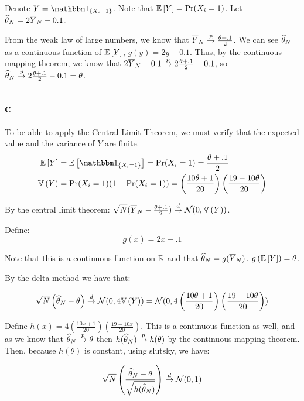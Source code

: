 \documentclass[12pt]{paper}
\begin{document}
Denote $Y = \indicate{X_i = 1}$. Note that $\mathbb{E} \left [ Y \right ] = \Pr( X_i
=1)$. Let $\widehat{ \theta }_{N} = 2 \overline{ Y }_{N} - 0.1$. 

From the weak law of large numbers, we know that $\overline{ Y }_{N} \overset{p}{\to}
\frac{\theta + .1}{2}$. We can see $\widehat{ \theta }_{N}$ as a continuous function of $\mathbb{E} \left [ Y \right ]$, $g(y)=2y-0.1$. Thus, by the continuous mapping theorem, we know
that 2$\overline{ Y }_{N}-0.1 \overset{p}{\to} 2\frac{\theta + .1}{2}-0.1$, so $\widehat{ \theta }_{N} \overset{p}{\to} 2
\frac{\theta + .1}{2} - 0.1 = \theta$.


\subsection*{c}
To be able to apply the Central Limit Theorem, we must verify that the
expected value and the variance of $Y$ are finite.
\begin{align*}
  \exV{Y} &= \exV{\indicate{X_i = 1}} = \Pr( X_i = 1 ) =
            \frac{\theta+.1}{2}\\
  \Vari{Y} &= \Pr( X_i = 1 )( 1 - \Pr( X_i = 1)) = \left(
             \frac{10\theta+1}{20}  \right) \left( \frac{19-10\theta}{20} \right)\\
\end{align*}

By the central limit theorem: $\sqrt{N}(\overline{ Y }_{N} - \frac{\theta+.1}{2})
\overset{d}{\to} \mathcal{N}(0,\mathbb{V} \left ( Y \right ))$.

Define:
\begin{equation*}
  g(x) = 2x - .1
\end{equation*}

Note that this is a continuous function on $\mathbb{R}$ and that $\widehat{ \theta }_{N} =
g(\overline{ Y }_{N})$. $g\left(\mathbb{E} \left [ Y \right ]\right) = \theta$.

By the delta-method we have that:

\begin{equation*}
  \sqrt{N} \left(  \widehat{ \theta }_{N} - \theta \right) \overset{d}{\to} \mathcal{N}( 0, 4
  \mathbb{V} \left ( Y \right )) = \mathcal{N}( 0, 4 \left(
             \frac{10\theta+1}{20}  \right) \left( \frac{19-10\theta}{20} \right))
\end{equation*}

Define
$h(x) = 4 \left( \frac{10x+1}{20} \right) \left( \frac{19-10x}{20}
\right)$. This is a continuous function as well, and as we know that
$\widehat{ \theta }_{N} \overset{p}{\to} \theta$ then $h(\widehat{ \theta }_{N}) \overset{p}{\to} h(\theta)$ by the continuous
mapping theorem. Then, because $h(\theta)$ is constant, using slutsky, we have:

\begin{equation*}
  \sqrt{N} \left(  \frac{\widehat{ \theta }_{N} - \theta}{\sqrt{h(\widehat{ \theta }_{N})}} \right) \overset{d}{\to}
  \mathcal{N}( 0, 1)
\end{equation*}
          
\end{document}
